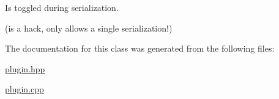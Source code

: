 Is toggled during serialization. 

(is a hack, only allows a single serialization!) 

The documentation for this class was generated from the following files\+:\begin{DoxyCompactItemize}
\item 
\hyperlink{plugin_8hpp}{plugin.\+hpp}\item 
\hyperlink{plugin_8cpp}{plugin.\+cpp}\end{DoxyCompactItemize}
